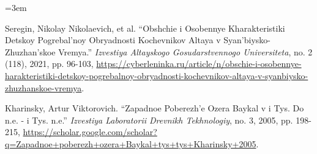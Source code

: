 \IfFileExists{../../_shared/template/intellte.cls}{\documentclass[10pt,onecolumn]{../../_shared/template/intellte}}{\documentclass[10pt,onecolumn]{intellte}}
\newlength{\csllabelwidth}
\newenvironment{CSLReferences}[2]
 {\par\vspace{2pt}%
  \begin{list}{}{%
  \normalfont\rmfamily\mdseries\fontsize{10pt}{15pt}\selectfont\raggedright
  \hyphenpenalty=50\exhyphenpenalty=50\emergencystretch=3em%
  \renewcommand{\bibitem}[2][]{\item\hypertarget{##2}{}}%
  \setlength{\lineskiplimit}{-6pt}%
  \setlength{\leftmargin}{\csllabelwidth}%
  \setlength{\itemindent}{-\csllabelwidth}%
  \setlength{\labelwidth}{\csllabelwidth}%
  \setlength{\labelsep}{0pt}%
  \setlength{\parsep}{0pt}%
  \setlength{\topsep}{0pt}%
  \setlength{\partopsep}{0pt}%
  \setlength{\itemsep}{2pt}}}
 {\end{list}}
\newcommand{\CSLLeftMargin}[1]{\makebox[\csllabelwidth][l]{\normalfont\rmfamily\mdseries\fontsize{10pt}{15pt}\selectfont #1}}
\newcommand{\CSLRightInline}[1]{\normalfont\rmfamily\mdseries\fontsize{10pt}{15pt}\selectfont #1}
\begin{document}
\begin{CSLReferences}{0}{0}
\CSLLeftMargin{26. }%
\CSLRightInline{Seregin, Nikolay Nikolaevich, et al. {``Obshchie i
Osobennye Kharakteristiki Detskoy Pogrebal'noy Obryadnosti Kochevnikov
Altaya v Syan'biysko-Zhuzhan'skoe Vremya.''} \emph{Izvestiya Altayskogo
Gosudarstvennogo Universiteta}, no. 2 (118), 2021, pp. 96-103,
\url{https://cyberleninka.ru/article/n/obschie-i-osobennye-harakteristiki-detskoy-pogrebalnoy-obryadnosti-kochevnikov-altaya-v-syanbiysko-zhuzhanskoe-vremya}.}

\CSLLeftMargin{27. }%
\CSLRightInline{Kharinsky, Artur Viktorovich. {``Zapadnoe Poberezh'e
Ozera Baykal v i Tys. Do n.e. - i Tys. n.e.''} \emph{Izvestiya
Laboratorii Drevnikh Tekhnologiy}, no. 3, 2005, pp. 198-215,
\url{https://scholar.google.com/scholar?q=Zapadnoe+poberezh+ozera+Baykal+tys+tys+Kharinsky+2005}.}

\end{CSLReferences}
\end{document}
